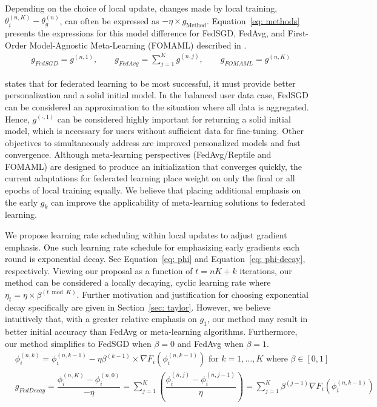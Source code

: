 \documentclass{article}
\begin{document}
Depending on the choice of local update, changes made by local training, $\theta_i^{(n, K)} - \theta_g^{(n)}$, can often be expressed as $-\eta \times g_{\textrm{Method}}$.
Equation~\ref{eq: methods} presents the expressions for this model difference for FedSGD, FedAvg, and First-Order Model-Agnostic Meta-Learning (FOMAML) described in \cite{maml}.
\begin{align}
    & g_{FedSGD} = g^{(n, 1)}, \qquad g_{FedAvg} = \sum_{j = 1}^K g^{(n, j)}, \qquad g_{FOMAML} = g^{(n, K)}  \label{eq: methods}
\end{align}

\cite{maml} states that for federated learning to be most successful, it must provide better personalization and a solid initial model.
In the balanced user data case, FedSGD can be considered an approximation to the situation where all data is aggregated.
Hence, $g^{(\cdot, 1)}$ can be considered highly important for returning a solid initial model, which is necessary for users without sufficient data for fine-tuning.
Other objectives to simultaneously address are improved personalized models and fast convergence.
Although meta-learning perspectives (FedAvg/Reptile and FOMAML) are designed to produce an initialization that converges quickly, the current adaptations for federated learning place weight on only the final or all epochs of local training equally.
We believe that placing additional emphasis on the early $g_k$ can improve the applicability of meta-learning solutions to federated learning. 

\medskip
We propose learning rate scheduling within local updates to adjust gradient emphasis.
One such learning rate schedule for emphasizing early gradients each round is exponential decay.
See Equation~\ref{eq: phi} and Equation~\ref{eq: phi-decay}, respectively.
Viewing our proposal as a function of $t = nK + k$ iterations, our method can be considered a locally decaying, cyclic learning rate where $\eta_t = \eta \times \beta^{(t \bmod K)}$.
Further motivation and justification for choosing exponential decay specifically are given in Section~\ref{sec: taylor}.
However, we believe intuitively that, with a greater relative emphasis on $g_1$, our method may result in better initial accuracy than FedAvg or meta-learning algorithms. 
Furthermore, our method simplifies to FedSGD when $\beta = 0$ and FedAvg when $\beta = 1$.
\begin{align}
    & \phi_i^{(n, k)} = \phi_i^{(n, k - 1)} - \eta \beta^{(k - 1)} \times \nabla F_i(\phi_i^{(n, k - 1)}) \textrm{ for } k = 1, \ldots, K \textrm{ where } \beta \in \left[0, 1\right] \label{eq: phi} \\
    & g_{FedDecay} = \dfrac{\phi_i^{(n, K)} - \phi_i^{(n, 0)}}{-\eta} = \sum_{j = 1}^K \left( \dfrac{\phi_i^{(n, j)} - \phi_i^{(n, j - 1)}}{\eta} \right) = \sum_{j = 1}^K \beta^{(j - 1)} \nabla F_i(\phi_i^{(n, k - 1)}) \label{eq: phi-decay} 
\end{align}
\end{document}
